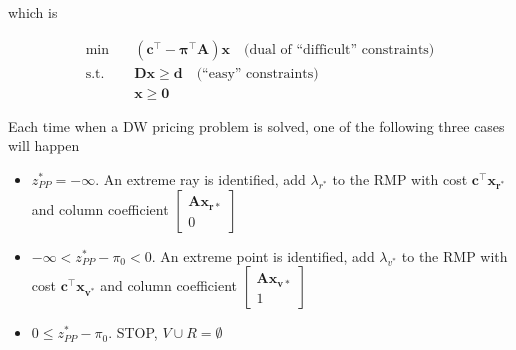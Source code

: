         which is

        \begin{align*}
            \min \quad & (\mathbf{c^\top - \pi^\top A})\mathbf{x} \quad \text{(dual of ``difficult'' constraints)}\\
            \text{s.t.} \quad & \mathbf{Dx \ge d} \quad \text{(``easy'' constraints)}\\
            & \mathbf{x \ge 0}
        \end{align*}

        Each time when a DW pricing problem is solved, one of the following three cases will happen

        \begin{itemize}
            \item $z_{PP}^* = -\infty$. An extreme ray is identified, add $\lambda_{r^*}$ to the RMP with cost $\mathbf{c^\top x_{r^*}}$ and column coefficient $\begin{bmatrix}\mathbf{Ax_{r*}} \\ 0\end{bmatrix}$
            \item $-\infty < z_{PP}^* - \pi_0 < 0$. An extreme point is identified, add $\lambda_{v^*}$ to the RMP with cost $\mathbf{c^\top x_{v^*}}$ and column coefficient $\begin{bmatrix}\mathbf{Ax_{v*}} \\ 1\end{bmatrix}$
            \item $0 \le z_{PP}^* - \pi_0$. STOP, $V \cup R = \emptyset$
        \end{itemize}




